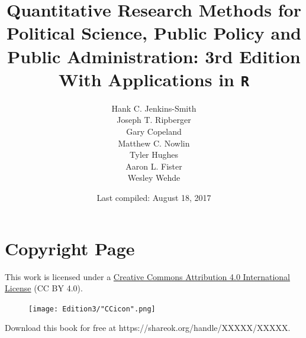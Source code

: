 \documentclass[11pt,openany]{book}\usepackage[]{graphicx}\usepackage[]{color}
\begin{document}


\title{Quantitative Research Methods for Political Science, Public Policy and Public Administration: 3rd Edition\\ 
  \large With Applications in \texttt{R}}
\author{Hank C. Jenkins-Smith\\ 
Joseph T. Ripberger\\
Gary Copeland\\
Matthew C. Nowlin\\
Tyler Hughes\\
Aaron L. Fister\\
Wesley Wehde}

\date{Last compiled: August 18, 2017}

\maketitle



\newpage
\chapter*{Copyright Page}

This work is licensed under a \href{https://creativecommons.org/licenses/by/4.0/ }{Creative Commons Attribution 4.0 International License} (CC BY 4.0). 

\begin{figure}[h]
\texttt{[image: Edition3/"CCicon".png]}
\label{fig:cc}
\end{figure}

Download this book for free at https://shareok.org/handle/XXXXX/XXXXX. 


{\singlespacing
  \tableofcontents
  
  \listoftables
  }





\newpage %
\end{document}
